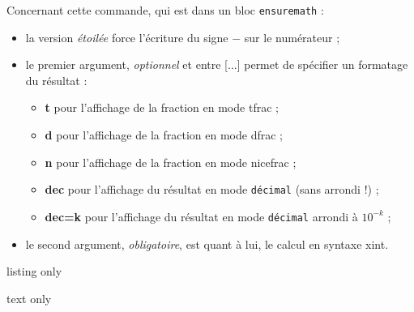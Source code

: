 \documentclass[french,a4paper,11pt]{article}
\newcommand\Cle[1]{{\bfseries\sffamily\textlangle #1\textrangle}}
\newcommand\cmaj[1]{\tcbox[vignetteMaJ]{#1}\xspace}
\begin{document}
\begin{tipblock}
Concernant cette commande, qui est dans un bloc \texttt{ensuremath} :

\begin{itemize}
	\item \cmaj{0.1.3} la version \textit{étoilée} force l'écriture du signe \og $-$ \fg{} sur le numérateur ;
	\item le premier argument, \textit{optionnel} et entre \textsf{[...]} permet de spécifier un formatage du résultat :
	\begin{itemize}
		\item \Cle{t} pour l'affichage de la fraction en mode \textsf{tfrac} ;
		\item \Cle{d} pour l'affichage de la fraction en mode \textsf{dfrac} ;
		\item \Cle{n} pour l'affichage de la fraction en mode \textsf{nicefrac} ;
		\item \Cle{dec} pour l'affichage du résultat en mode \texttt{décimal} (sans arrondi !) ;
		\item \Cle{dec=k} pour l'affichage du résultat en mode \texttt{décimal} arrondi à $10^{-k}$ ;
	\end{itemize}
	\item le second argument, \textit{obligatoire}, est quant à lui, le calcul en syntaxe \textsf{xint}.
\end{itemize}
\vspace*{-\baselineskip}\leavevmode
\end{tipblock}

\begin{PresentationCode}{listing only}
\end{PresentationCode}

\begin{PresentationCode}{text only}
\hfill{} \qquad
{} \qquad
{} \qquad
{} \qquad
{} \qquad
{}\hfill~
\end{PresentationCode}
\end{document}
